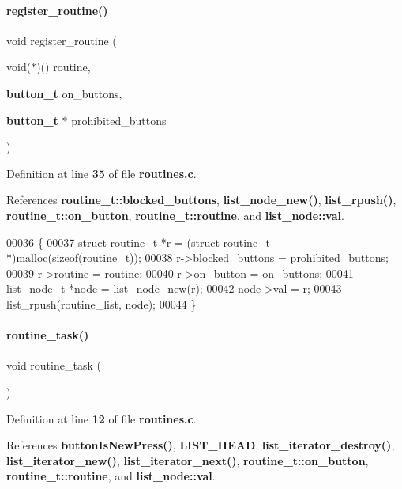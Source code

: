 \paragraph{register\+\_\+routine()}
{\footnotesize\ttfamily void register\+\_\+routine (\begin{DoxyParamCaption}\item[{void($\ast$)()}]{routine,  }\item[{\textbf{ button\+\_\+t}}]{on\+\_\+buttons,  }\item[{\textbf{ button\+\_\+t} $\ast$}]{prohibited\+\_\+buttons }\end{DoxyParamCaption})}



Definition at line \textbf{ 35} of file \textbf{ routines.\+c}.



References \textbf{ routine\+\_\+t\+::blocked\+\_\+buttons}, \textbf{ list\+\_\+node\+\_\+new()}, \textbf{ list\+\_\+rpush()}, \textbf{ routine\+\_\+t\+::on\+\_\+button}, \textbf{ routine\+\_\+t\+::routine}, and \textbf{ list\+\_\+node\+::val}.


\begin{DoxyCode}
00036                                                     \{
00037   \textcolor{keyword}{struct }routine_t *r = (\textcolor{keyword}{struct }routine_t *)malloc(\textcolor{keyword}{sizeof}(routine_t));
00038   r->blocked_buttons = prohibited\_buttons;
00039   r->routine = routine;
00040   r->on_button = on\_buttons;
00041   list_node_t *node = list_node_new(r);
00042   node->val = r;
00043   list_rpush(routine_list, node);
00044 \}
\end{DoxyCode}
\mbox{\label{a00059_a230cdcefb410a429fb6baba1f88fc9ba}} 
\paragraph{routine\+\_\+task()}
{\footnotesize\ttfamily void routine\+\_\+task (\begin{DoxyParamCaption}{ }\end{DoxyParamCaption})}



Definition at line \textbf{ 12} of file \textbf{ routines.\+c}.



References \textbf{ button\+Is\+New\+Press()}, \textbf{ L\+I\+S\+T\+\_\+\+H\+E\+AD}, \textbf{ list\+\_\+iterator\+\_\+destroy()}, \textbf{ list\+\_\+iterator\+\_\+new()}, \textbf{ list\+\_\+iterator\+\_\+next()}, \textbf{ routine\+\_\+t\+::on\+\_\+button}, \textbf{ routine\+\_\+t\+::routine}, and \textbf{ list\+\_\+node\+::val}.



